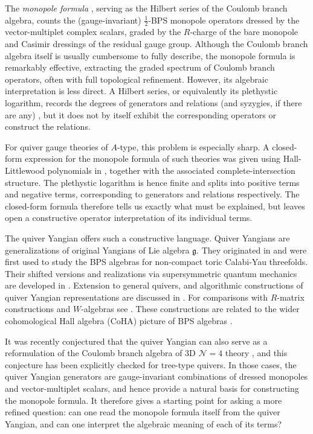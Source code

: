 \documentclass[12pt,a4paper]{article}
\begin{document}
The \textit{monopole formula} \cite{CremonesiHananyZaffaroni2014}, serving as the Hilbert series of the Coulomb branch algebra, counts the (gauge-invariant) $\frac 1 2$-BPS monopole operators dressed by the vector-multiplet complex scalars, graded by the $R$-charge of the bare monopole and Casimir dressings of the residual gauge group.
Although the Coulomb branch algebra itself is usually cumbersome to fully describe, the monopole formula is remarkably effective, extracting the graded spectrum of Coulomb branch operators, often
with full topological refinement. However, its algebraic interpretation is less
direct.  A Hilbert series, or equivalently its plethystic
logarithm, records the degrees of
generators and relations (and syzygies, if there are any) \cite{BenvenutiEtAl2006}, but it does not by itself exhibit
the corresponding operators or construct the relations.

For quiver gauge theories of $A$-type, this problem is especially sharp. 
A closed-form 
expression for the monopole formula of such
theories was given using Hall-Littlewood polynomials in \cite{CremonesiEtAl2014}, together with the
associated complete-intersection structure.  The plethystic
logarithm is hence finite and splits into positive terms and negative terms, corresponding to generators and relations respectively.
The closed-form formula therefore tells us exactly what must be
explained, but leaves open a constructive operator interpretation of its
individual terms.

\medskip

The quiver Yangian offers such a constructive language.  Quiver Yangians are generalizations of original Yangians of Lie algebra $\mathfrak g$. They  originated in \cite{LiYamazaki2020} and were first used to study the BPS algebras for non-compact toric Calabi-Yau threefolds.
Their shifted versions and realizations via supersymmetric quantum mechanics are developed in \cite{GalakhovLiYamazaki2021,GalakhovYamazaki2022}.
Extension to general quivers, and algorithmic constructions of quiver Yangian representations are discussed in
\cite{Li2024,GalakhovEtAl2024}.
For comparisons with $R$-matrix constructions and $W$-algebras see \cite{Bao2022,Bao2023}. These constructions are related to the wider
cohomological Hall algebra (CoHA) picture of BPS algebras
\cite{KontsevichSoibelman2011}.

It was recently conjectured that the quiver Yangian can also serve as a reformulation of the Coulomb branch algebra of 3D $\mathcal N=4$ theory \cite{ChenLi2026}, and this conjecture has been explicitly checked for tree-type quivers. In those cases, the quiver Yangian generators are  gauge-invariant combinations of dressed monopoles and vector-multiplet scalars, and hence provide a natural basis for constructing the monopole formula.
It therefore gives a
starting point for asking a more refined question: can one read the monopole
formula itself from the quiver Yangian, and can one interpret the
algebraic meaning of each of its terms?
\end{document}
